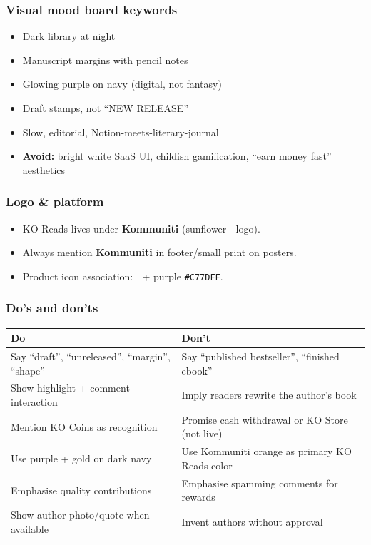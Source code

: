 \documentclass[11pt,a4paper]{report}
\begin{document}
\subsubsection{Visual mood board keywords}

\begin{itemize}
  \item Dark library at night
  \item Manuscript margins with pencil notes
  \item Glowing purple on navy (digital, not fantasy)
  \item Draft stamps, not “NEW RELEASE”
  \item Slow, editorial, Notion-meets-literary-journal
  \item \textbf{Avoid:} bright white SaaS UI, childish gamification, “earn money fast” aesthetics
\end{itemize}

\subsubsection{Logo \& platform}

\begin{itemize}
  \item KO Reads lives under \textbf{Kommuniti} (sunflower 🌻 logo).
  \item Always mention \textbf{Kommuniti} in footer/small print on posters.
  \item Product icon association: 📖 + purple \texttt{\#C77DFF}.
\end{itemize}

\subsubsection{Do’s and don’ts}

\begin{longtable}{|l|l|}
\hline
Do & Don’t \\ \hline
Say “draft”, “unreleased”, “margin”, “shape” & Say “published bestseller”, “finished ebook” \\ \hline
Show highlight + comment interaction & Imply readers rewrite the author’s book \\ \hline
Mention KO Coins as recognition & Promise cash withdrawal or KO Store (not live) \\ \hline
Use purple + gold on dark navy & Use Kommuniti orange as primary KO Reads color \\ \hline
Emphasise quality contributions & Emphasise spamming comments for rewards \\ \hline
Show author photo/quote when available & Invent authors without approval \\
\hline
\end{longtable}
\end{document}
